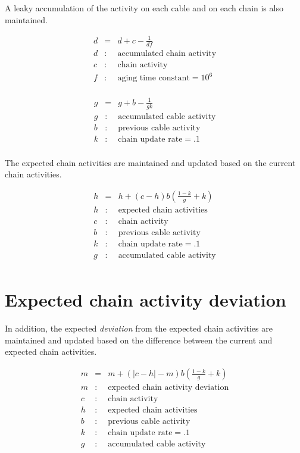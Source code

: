 \documentclass[oneside,twocolumn]{article}
\begin{document}
A leaky accumulation of the activity on each cable and on each chain is also maintained.

\begin{eqnarray*}
d &= & d + c - \frac{1}{df}\\ 
d &:& \mbox{accumulated chain activity} \\
c &:& \mbox{chain activity} \\
f &:& \mbox{aging time constant} = 10^6 \\
\end{eqnarray*}

\begin{eqnarray*}
g &= & g + b - \frac{1}{gk}\\ 
g &:& \mbox{accumulated cable activity} \\
b &:& \mbox{previous cable activity} \\
k &:& \mbox{chain update rate} = .1 \\
\end{eqnarray*}

The expected chain activities are maintained and updated based on the current chain activities. 

\begin{eqnarray*}
h &= & h + (c-h)b \left ( \frac{1 - k}{g} + k \right)\\ 
h &:& \mbox{expected chain activities} \\
c &:& \mbox{chain activity} \\
b &:& \mbox{previous cable activity} \\
k &:& \mbox{chain update rate} = .1 \\
g &:& \mbox{accumulated cable activity} \\
\end{eqnarray*}

\section*{\color{copper} Expected chain activity deviation}

In addition, the expected {\em deviation} from the expected chain activities are maintained and updated based on the difference between the current and expected chain activities. 

\begin{eqnarray*}
m &= & m + (|c-h|-m) b \left ( \frac{1 - k}{g} + k \right)\\ 
m &:& \mbox{expected chain activity deviation} \\
c &:& \mbox{chain activity} \\
h &:& \mbox{expected chain activities} \\
b &:& \mbox{previous cable activity} \\
k &:& \mbox{chain update rate} = .1 \\
g &:& \mbox{accumulated cable activity}
\end{eqnarray*}
\end{document}
